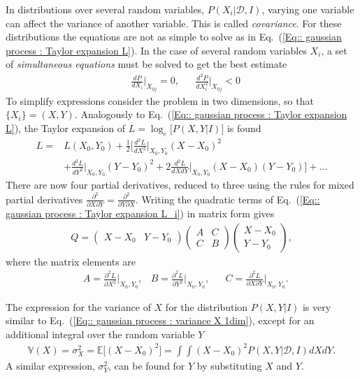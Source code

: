 \documentclass[twoside,english]{uiofysmaster}
\begin{document}
In distributions over several random variables, $P(X_i| \mathcal{D}, I)$, varying one variable can affect the variance of another variable. This is called \textit{covariance}. For these distributions the equations are not as simple to solve as in Eq.\ (\ref{Eq:: gaussian process : Taylor expansion L}). In the case of several random variables $X_i$, a set of \textit{simultaneous equations} must be solved to get the best estimate
\begin{align}\label{Eq:: gaussian process : Best estimate X_i}
&\frac{dP}{dX_i} \Big|_{X_{0j}} =0, &&\frac{d^2P}{dX_i^2} \Big|_{X_{0j}} < 0
\end{align}
To simplify expressions consider the problem in two dimensions, so that $\{ X_i \} = (X, Y)$. Analogously to Eq.~(\ref{Eq:: gaussian process : Taylor expansion L}), the Taylor expansion of $L = \log_e \Big[ P(X, Y |I) \Big]$ is found
\begin{align}\label{Eq:: gaussian process : Taylor expansion L_i}
L =& L(X_0, Y_0) + \frac{1}{2} \Big[ \frac{d^2L}{dX^2}  \Big|_{X_0, Y_0}(X-X_0)^2 \nonumber \\
& + \frac{d^2L}{dY^2}  \Big|_{X_0, Y_0}(Y-Y_0)^2 + 2 \frac{d^2L}{dXdY}  \Big|_{X_0, Y_0}(X-X_0)(Y-Y_0) \Big] +...
\end{align}
There are now four partial derivatives, reduced to three using the rules for mixed partial derivatives $\frac{\partial^2}{\partial X \partial Y} = \frac{\partial^2}{\partial Y \partial X}$. Writing the quadratic terms of Eq.~(\ref{Eq:: gaussian process : Taylor expansion L_i}) in matrix form gives
\begin{align}
Q = 
\begin{pmatrix}
X-X_0 & Y -Y_0
\end{pmatrix}
\begin{pmatrix}
A & C\\
C & B
\end{pmatrix}
\begin{pmatrix}
X -X_0\\
Y-Y_0
\end{pmatrix},
\end{align}
where the matrix elements are
\begin{align}
&A = \frac{\partial^2 L}{\partial X^2} \Big|_{X_0, Y_0}, &B = \frac{\partial^2 L}{\partial Y^2} \Big|_{X_0, Y_0}, &&C = \frac{\partial^2 L}{\partial X \partial Y} \Big|_{X_0, Y_0}.
\end{align}

The expression for the variance of $X$ for the distribution $P(X,Y| I)$ is very similar to Eq.~(\ref{Eq:: gaussian process : variance X 1dim}), except for an additional integral over the random variable $Y$
\begin{align}
\mathbb{V}(X) = \sigma^2_X = \mathbb{E} \big[ (X-X_0)^2 \big] = \int \int (X-X_0)^2 P(X,Y | \mathcal{D}, I) dXdY.
\end{align}
A similar expression, $\sigma_Y^2$, can be found for $Y$ by substituting $X$ and $Y$. 
\end{document}
